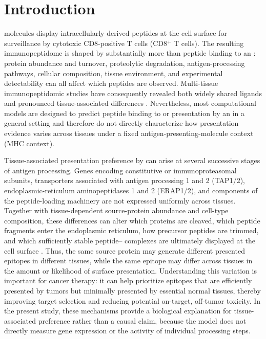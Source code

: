 \section{Introduction}

\plainMHCI{} molecules display intracellularly derived peptides at the cell surface for surveillance by cytotoxic CD8-positive T cells (CD8\(^{+}\) T cells). The resulting immunopeptidome is shaped by substantially more than peptide binding to an \plainMHC{}: protein abundance and turnover, proteolytic degradation, antigen-processing pathways, cellular composition, tissue environment, and experimental detectability can all affect which peptides are observed. Multi-tissue immunopeptidomic studies have consequently revealed both widely shared ligands and pronounced tissue-associated differences \cite{marcu2021atlas,schuster2018mouse}. Nevertheless, most computational models are designed to predict peptide binding to or presentation by an \plainMHC{} in a general setting and therefore do not directly characterize how presentation evidence varies across tissues under a fixed antigen-presenting-molecule context (MHC context).

Tissue-associated presentation preference by \plainMHCI{} can arise at several successive stages of antigen processing. Genes encoding constitutive or immunoproteasomal subunits, transporters associated with antigen processing 1 and 2 (TAP1/2), endoplasmic-reticulum aminopeptidases 1 and 2 (ERAP1/2), and components of the peptide-loading machinery are not expressed uniformly across tissues. Together with tissue-dependent source-protein abundance and cell-type composition, these differences can alter which proteins are cleaved, which peptide fragments enter the endoplasmic reticulum, how precursor peptides are trimmed, and which sufficiently stable peptide--\plainMHCI{} complexes are ultimately displayed at the cell surface \cite{kubiniok2022constitutive}. Thus, the same source protein may generate different presented epitopes in different tissues, while the same epitope may differ across tissues in the amount or likelihood of surface presentation. Understanding this variation is important for cancer therapy: it can help prioritize epitopes that are efficiently presented by tumors but minimally presented by essential normal tissues, thereby improving target selection and reducing potential on-target, off-tumor toxicity. In the present study, these mechanisms provide a biological explanation for tissue-associated preference rather than a causal claim, because the model does not directly measure gene expression or the activity of individual processing steps.

